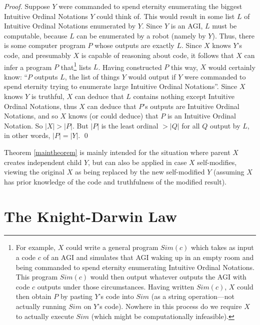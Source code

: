 \documentclass[runningheads]{llncs}
\begin{document}
\begin{proof}
    Suppose $Y$ were commanded to
    spend eternity enumerating the biggest Intuitive Ordinal Notations $Y$ could
    think of. This would result in some list $L$ of Intuitive Ordinal Notations
    enumerated by $Y$. Since $Y$ is an AGI, $L$ must be computable, because $L$ can
    be enumerated by a robot (namely by $Y$). Thus, there is some computer program
    $P$ whose outputs are exactly $L$.
    Since $X$ knows $Y$'s code,
    and presumably $X$ is capable of reasoning about code,
    it follows that $X$ can infer a program $P$ that\footnote{For example,
    $X$ could write a general program $Sim(c)$ which takes as input a code
    $c$ of an AGI and simulates that AGI waking up in an empty room and being commanded
    to spend eternity enumerating Intuitive Ordinal Notations. This program $Sim(c)$
    would then output whatever outputs the AGI with code $c$ outputs under those
    circumstances. Having written $Sim(c)$, $X$ could then obtain $P$ by
    pasting $Y$'s code into $Sim$ (as a string operation---not actually running $Sim$
    on $Y$'s code).
    Nowhere in this process do we require $X$ to actually
    execute $Sim$ (which might be computationally infeasible).} lists $L$.
    Having constructed $P$ this way, $X$ would certainly know: ``$P$ outputs
    $L$, the list of things $Y$ would output if $Y$ were commanded to spend eternity
    trying to enumerate large Intuitive Ordinal Notations''.
    Since $X$ knows $Y$ is truthful,
    $X$ can deduce that $L$ contains nothing except Intuitive Ordinal Notations,
    thus $X$ can deduce that $P$'s outputs are Intuitive Ordinal Notations,
    and so $X$ knows (or could deduce) that $P$ is an Intuitive Ordinal Notation.
    So $|X|>|P|$. But $|P|$ is
    the least ordinal $>|Q|$ for all $Q$ output by $L$, in other words,
    $|P|=|Y|$.
    \qed
\end{proof}

Theorem \ref{maintheorem} is mainly intended for the situation where parent $X$ creates
independent child $Y$, but can also be applied in case $X$ self-modifies,
viewing the original $X$ as being replaced by the new self-modified
$Y$ (assuming $X$ has prior
knowledge of the code and truthfulness of the modified result).

\section{The Knight-Darwin Law}
\label{knightdarwinagisection}
\end{document}
